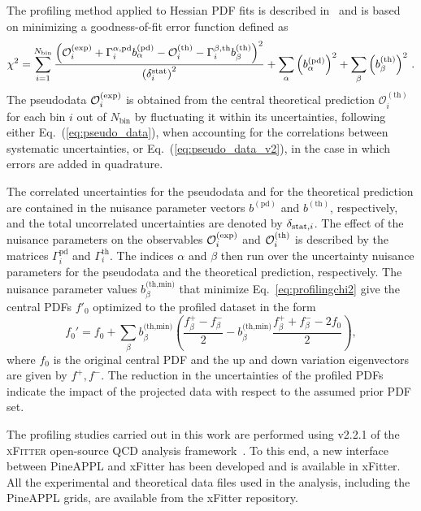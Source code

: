 The profiling method applied to Hessian PDF fits is described in~\cite{Paukkunen:2014zia, Schmidt:2018hvu, AbdulKhalek:2018rok, HERAFitterdevelopersTeam:2015cre} and is based
on minimizing a goodness-of-fit error function defined as
\begin{equation}
\chi^2 = 
\sum_{i=1}^{N_{\textrm{bin}}} 
{{\left(  \mathcal{O}_i^{\rm (exp)}
            + \Gamma_i^{\alpha,\textrm{pd}}
              b_\alpha^{\textrm{(pd)}}
            - \mathcal{O}_i^{\rm (th)}
            - \Gamma_i^{\beta,\textrm{th}}
              b_\beta^{(\textrm{th})}
     \right)^2
     }\over { \left(\delta_i^{\rm stat}\right)^2 }}
+ \sum_\alpha \left( b_\alpha^{(\textrm{pd})}\right)^2
+ \sum_\beta  \left( b_\beta^{\textrm{(th)}}\right) ^2 \, .
\label{eq:profilingchi2}
\end{equation}
The pseudodata 
$\mathcal{O}_i^{\rm (exp)}$ 
is obtained from the central theoretical prediction 
$\mathcal{O}_i^{(\textrm{th})}$
for each bin $i$ out of $N_{\textrm{bin}}$ by fluctuating
it within its uncertainties, following either
Eq.~(\ref{eq:pseudo_data}), when accounting for the correlations
between systematic uncertainties, or Eq.~(\ref{eq:pseudo_data_v2}),
in the case in which errors are added in quadrature.

The correlated uncertainties for the pseudodata and for the theoretical prediction 
are contained in the nuisance parameter vectors $b^{(\textrm{pd})}$ and $b^{(\textrm{th})}$, respectively, and the total uncorrelated uncertainties are denoted by $\delta_{{\rm stat},i}$.
%
The effect of the nuisance parameters
on the observables $\mathcal{O}_i^{\rm (exp)}$ and $\mathcal{O}_i^{\rm (th)}$
is described by the matrices $\Gamma_i^{\textrm{pd}}$ and $\Gamma_i^{\textrm{th}}$.
%
The indices $\alpha$ and $\beta$ then run over the uncertainty nuisance parameters for the pseudodata and the theoretical prediction, respectively.
%
The nuisance parameter values $b_\beta^{\textrm{(th,min)}}$ that minimize Eq.~\eqref{eq:profilingchi2} give the central PDFs $f'_0$ optimized to the profiled dataset in the form
\begin{equation}
f_0' = f_0
      + \sum_\beta b_\beta^{\textrm{(th,min)}} 
        \left(  \frac{f_\beta^+   -  f_\beta^- }{2}
              -    b_\beta^{\textrm{(th,min)}}
                \frac{f_\beta^+ + f_\beta^- - 2f_0}{2}
        \right),
\end{equation}
where $f_0$ is the original central PDF and the up and down variation eigenvectors are given by $f^+, f^-$.
%
The reduction in the uncertainties of the profiled PDFs indicate the impact
of the projected data with respect to the assumed prior PDF set.


The profiling studies carried out in this work are performed using v2.2.1 of the \textsc{xFitter} open-source QCD analysis framework~\cite{Alekhin:2014irh, Bertone:2017tig, xFitter:2022zjb, xFitter:web}.
%
To this end, a new interface between  {\sc\small PineAPPL} and {\sc\small xFitter} has been developed and is available in {\sc\small xFitter}.
%
All the experimental and theoretical data files used in the analysis, including
the  {\sc\small PineAPPL}  grids, are available
from the {\sc\small xFitter} repository.




